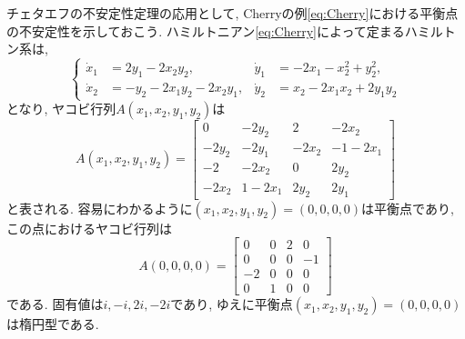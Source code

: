 \documentclass[a4paper]{ujarticle}
\theoremstyle{definition}
\begin{document}
    チェタエフの不安定性定理の応用として, Cherryの例\eqref{eq:Cherry}における平衡点の不安定性を示しておこう.
    ハミルトニアン\eqref{eq:Cherry}によって定まるハミルトン系は,
    \begin{equation} \label{eq:Cherry_ode}
        \left\{
            \begin{aligned}
                \dot{x}_1 &= 2 y_1 - 2 x_2 y_2, & \dot{y}_1 &= - 2 x_1 - x_2^2 + y_2^2, \\
                \dot{x}_2 &= - y_2 - 2 x_1 y_2 - 2 x_2 y_1, & \dot{y}_2 &= x_2 - 2 x_1 x_2 + 2 y_1 y_2
            \end{aligned}
        \right.
    \end{equation}
    となり, ヤコビ行列$A(x_1, x_2, y_1, y_2)$は
    \begin{equation}
        A(x_1, x_2, y_1, y_2) = 
        \begin{bmatrix}
            0 & - 2 y_2 & 2 & - 2 x_2 \\
            - 2 y_2 & - 2 y_1 &- 2 x_2 & - 1 - 2 x_1 \\
            - 2 & - 2 x_2 & 0 & 2 y_2 \\
            - 2 x_2 & 1 - 2 x_1 &  2 y_2 & 2 y_1
        \end{bmatrix}
    \end{equation} 
    と表される.
    容易にわかるように$(x_1, x_2, y_1, y_2) = (0, 0, 0, 0)$は平衡点であり,
    この点におけるヤコビ行列は
    \begin{equation}
        A(0, 0, 0, 0) = 
        \begin{bmatrix}
            0 & 0 & 2 & 0 \\
            0 & 0 & 0 & - 1 \\
            - 2 & 0 & 0 & 0 \\
            0 & 1 & 0 & 0
        \end{bmatrix}
    \end{equation} 
    である. 固有値は$i, -i, 2i, -2i$であり, 
    ゆえに平衡点$(x_1, x_2, y_1, y_2) = (0, 0, 0, 0)$は楕円型である.
\end{document}
